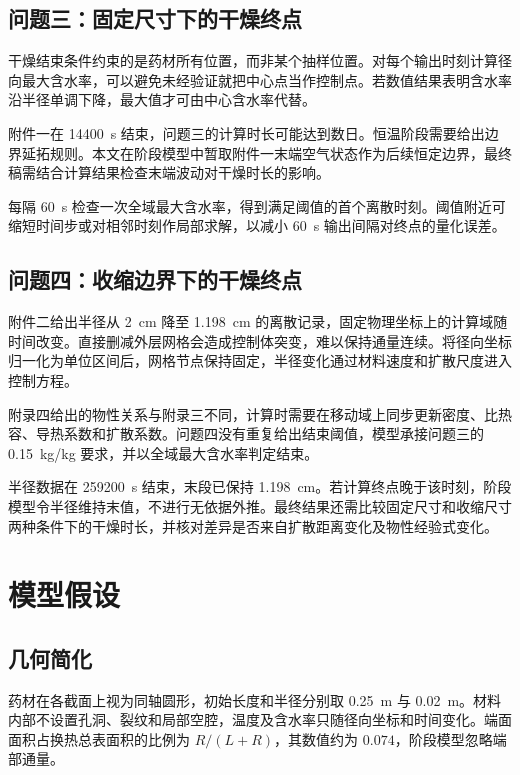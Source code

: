 \documentclass[withoutpreface,bwprint]{cumcmthesis}
\begin{document}
\subsection{问题三：固定尺寸下的干燥终点}

干燥结束条件约束的是药材所有位置，而非某个抽样位置。对每个输出时刻计算径向最大含水率，可以避免未经验证就把中心点当作控制点。若数值结果表明含水率沿半径单调下降，最大值才可由中心含水率代替。

附件一在 \SI{14400}{s} 结束，问题三的计算时长可能达到数日。恒温阶段需要给出边界延拓规则。本文在阶段模型中暂取附件一末端空气状态作为后续恒定边界，最终稿需结合计算结果检查末端波动对干燥时长的影响。

每隔 \SI{60}{s} 检查一次全域最大含水率，得到满足阈值的首个离散时刻。阈值附近可缩短时间步或对相邻时刻作局部求解，以减小 \SI{60}{s} 输出间隔对终点的量化误差。

\subsection{问题四：收缩边界下的干燥终点}

附件二给出半径从 \SI{2}{cm} 降至 \SI{1.198}{cm} 的离散记录，固定物理坐标上的计算域随时间改变。直接删减外层网格会造成控制体突变，难以保持通量连续。将径向坐标归一化为单位区间后，网格节点保持固定，半径变化通过材料速度和扩散尺度进入控制方程。

附录四给出的物性关系与附录三不同，计算时需要在移动域上同步更新密度、比热容、导热系数和扩散系数。问题四没有重复给出结束阈值，模型承接问题三的 \SI{0.15}{kg/kg} 要求，并以全域最大含水率判定结束。

半径数据在 \SI{259200}{s} 结束，末段已保持 \SI{1.198}{cm}。若计算终点晚于该时刻，阶段模型令半径维持末值，不进行无依据外推。最终结果还需比较固定尺寸和收缩尺寸两种条件下的干燥时长，并核对差异是否来自扩散距离变化及物性经验式变化。

\section{模型假设}

\subsection{几何简化}

药材在各截面上视为同轴圆形，初始长度和半径分别取 \SI{0.25}{m} 与 \SI{0.02}{m}。材料内部不设置孔洞、裂纹和局部空腔，温度及含水率只随径向坐标和时间变化。端面面积占换热总表面积的比例为 \(R/(L+R)\)，其数值约为 \(0.074\)，阶段模型忽略端部通量。
\end{document}
